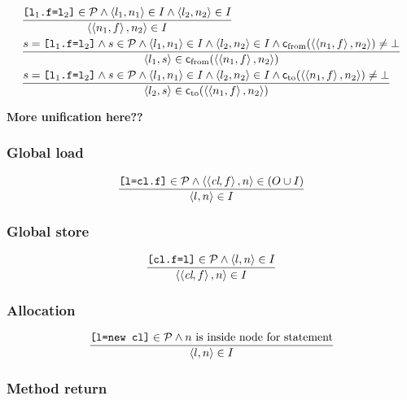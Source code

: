 \documentclass[11pt,notitlepage]{article}
\newcommand{\bigvar}[1]{\ensuremath{\text{\it #1}}}
\newcommand{\func}[1]{\ensuremath{\text{\sffamily #1}}}
\begin{document}
\begin{eqnarray*}&
\dfrac
{\text{\tt [l$_1$.f=l$_2$]}\in\mathcal{P} \wedge
 \tuple{l_1,n_1}\in I \wedge
 \tuple{l_2,n_2}\in I }
{\tuple{\tuple{n_1,f},n_2}\in I}
\\&
\dfrac
{s=\text{\tt [l$_1$.f=l$_2$]}\wedge s\in\mathcal{P} \wedge
 \tuple{l_1,n_1}\in I \wedge
 \tuple{l_2,n_2}\in I \wedge
 \func{c}_\text{from}(\tuple{\tuple{n_1,f},n_2})\neq\bot
}
{\tuple{l_1,s}\in\func{c}_\text{from}(\tuple{\tuple{n_1,f},n_2}) }
\\&
\dfrac
{s=\text{\tt [l$_1$.f=l$_2$]}\wedge s\in\mathcal{P} \wedge
 \tuple{l_1,n_1}\in I \wedge
 \tuple{l_2,n_2}\in I \wedge
 \func{c}_\text{to}(\tuple{\tuple{n_1,f},n_2})\neq\bot
}
{\tuple{l_2,s}\in\func{c}_\text{to}(\tuple{\tuple{n_1,f},n_2}) }
\end{eqnarray*}

\textbf{More unification here??}

\subsubsection{Global load}

\begin{displaymath}
\dfrac
{\text{\tt [l=cl.f]}\in\mathcal{P} \wedge
 \tuple{\tuple{\bigvar{cl},f},n}\in (O\cup I) }
{\tuple{l,n}\in I}
\end{displaymath}

\subsubsection{Global store}

\begin{displaymath}
\dfrac
{\text{\tt [cl.f=l]}\in\mathcal{P} \wedge
 \tuple{l,n}\in I}
{\tuple{\tuple{\bigvar{cl},f},n}\in I}
\end{displaymath}

\subsubsection{Allocation}

\begin{displaymath}
\dfrac
{\text{\tt [l=new cl]}\in\mathcal{P} \wedge
 n \text{ is inside node for statement} }
{\left\langle l,n \right\rangle\in I}
\end{displaymath}

\subsubsection{Method return}
\end{document}
